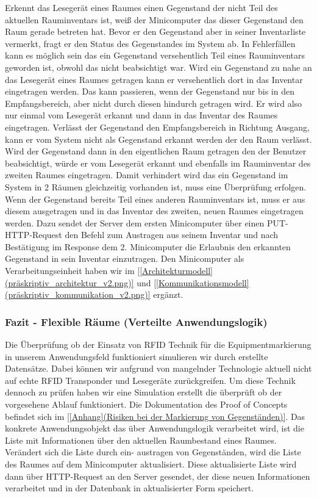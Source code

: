 Erkennt das Lesegerät eines Raumes einen Gegenstand der nicht Teil des
aktuellen Rauminventars ist, weiß der Minicomputer das dieser Gegenstand
den Raum gerade betreten hat. Bevor er den Gegenstand aber in seiner
Inventarliste vermerkt, fragt er den Status des Gegenstandes im System ab.
In Fehlerfällen kann es möglich sein das ein Gegenstand versehentlich Teil
eines Rauminventars geworden ist, obwohl das nicht beabsichtigt war. Wird ein
Gegenstand zu nahe an das Lesegerät eines Raumes getragen kann er
versehentlich dort in das Inventar eingetragen werden. Das kann passieren,
wenn der Gegenstand nur bis in den Empfangsbereich, aber nicht durch diesen
hindurch getragen wird. Er wird also nur einmal vom Lesegerät erkannt und dann
in das Inventar des Raumes eingetragen. Verlässt der Gegenstand den
Empfangsbereich in Richtung Ausgang, kann er vom System nicht als Gegenstand
erkannt werden der den Raum verlässt. Wird der Gegenstand dann in den
eigentlichen Raum getragen den der Benutzer beabsichtigt, würde er vom
Lesegerät erkannt und ebenfalls im Rauminventar des zweiten Raumes eingetragen.
Damit verhindert wird das ein Gegenstand im System in 2 Räumen gleichzeitig
vorhanden ist, muss eine Überprüfung erfolgen. Wenn der Gegenstand bereits Teil
eines anderen Rauminventars ist, muss er aus diesem ausgetragen und in das
Inventar des zweiten, neuen Raumes eingetragen werden. Dazu sendet der Server
dem ersten Minicomputer über einen PUT-HTTP-Request den Befehl zum Austragen
aus seinem Inventar und nach Bestätigung im Response dem 2. Minicomputer die
Erlaubnis den erkannten Gegenstand in sein Inventar einzutragen.
Den Minicomputer als Verarbeitungseinheit haben wir im \ref{[Architekturmodell](präskriptiv_architektur_v2.png)} 
und \ref{[Kommunikationsmodell](präskriptiv_kommunikation_v2.png)} ergänzt.


\subsubsection{Fazit - Flexible Räume (Verteilte Anwendungslogik)}
\label{sec:Fazit - Flexible Räume (Verteilte Anwendungslogik}

Die Überprüfung ob der Einsatz von RFID Technik für die Equipmentmarkierung in
unserem Anwendungsfeld funktioniert simulieren wir durch erstellte Datensätze.
Dabei können wir aufgrund von mangelnder Technologie aktuell nicht auf echte
RFID Transponder und Lesegeräte zurückgreifen. Um diese Technik dennoch zu
prüfen haben wir eine Simulation erstellt die überprüft ob der vorgesehene
Ablauf funktioniert. Die Dokumentation des Proof of Concepts befindet sich im
\ref{[Anhang](Risiken bei der Markierung von Gegenständen)}.
Das konkrete Anwendungsobjekt das über Anwendungslogik verarbeitet wird, ist
die Liste mit Informationen über den aktuellen Raumbestand eines Raumes.
Verändert sich die Liste durch ein- \bzw austragen von Gegenständen, wird die
Liste des Raumes auf dem Minicomputer aktualisiert. Diese aktualisierte Liste
wird dann über HTTP-Request an den Server gesendet, der diese neuen
Informationen verarbeitet und in der Datenbank in aktualisierter Form speichert.


